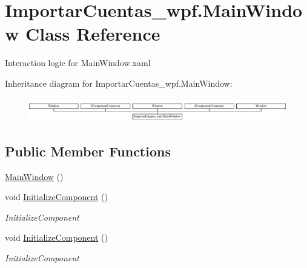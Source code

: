 \hypertarget{class_importar_cuentas__wpf_1_1_main_window}{\section{Importar\-Cuentas\-\_\-wpf.\-Main\-Window Class Reference}
\label{class_importar_cuentas__wpf_1_1_main_window}
}


Interaction logic for Main\-Window.\-xaml  


Inheritance diagram for Importar\-Cuentas\-\_\-wpf.\-Main\-Window\-:\begin{figure}[H]
\begin{center}
\leavevmode
\includegraphics[height=1.041860cm]{d0/df3/class_importar_cuentas__wpf_1_1_main_window}
\end{center}
\end{figure}
\subsection*{Public Member Functions}
\begin{DoxyCompactItemize}
\item 
\hyperlink{class_importar_cuentas__wpf_1_1_main_window_ab4bb322653a84bb50c765e85a2a0bb5c}{Main\-Window} ()
\item 
void \hyperlink{class_importar_cuentas__wpf_1_1_main_window_ae7d900b7eadb6ce31ebd8072cabe87f3}{Initialize\-Component} ()
\begin{DoxyCompactList}\small\item\em Initialize\-Component \end{DoxyCompactList}\item 
void \hyperlink{class_importar_cuentas__wpf_1_1_main_window_ae7d900b7eadb6ce31ebd8072cabe87f3}{Initialize\-Component} ()
\begin{DoxyCompactList}\small\item\em Initialize\-Component \end{DoxyCompactList}\end{DoxyCompactItemize}
